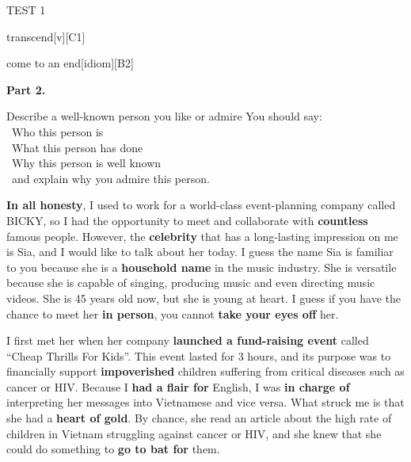 \begin{glossarymc}[Cambridge 5]
\begin{test}{TEST 1}
\begin{VocabExplain}[Part 1]
            \begin{ExplainCard}{transcend}[v][C1]
            \end{ExplainCard}

            \begin{ExplainCard}{come to an end}[idiom][B2]
            \end{ExplainCard}
        \end{VocabExplain}

    \noindent
    \textbf{Part 2.}
    \begin{qa}{Describe a well-known person you like or admire}
        You should say:\\
        \textbullet\ Who this person is\\
        \textbullet\ What this person has done\\
        \textbullet\ Why this person is well known\\
        \textbullet\ and explain why you admire this person.

        \textbf{In all honesty}, I used to work for a world-class event-planning company called BICKY, so I had the opportunity to meet and collaborate with \textbf{countless} famous people. However, the \textbf{celebrity} that has a long-lasting impression on me is Sia, and I would like to talk about her today. I guess the name Sia is familiar to you because she is a \textbf{household name} in the music industry. She is versatile because she is capable of singing, producing music and even directing music videos. She is 45 years old now, but she is young at heart. I guess if you have the chance to meet her \textbf{in person}, you cannot \textbf{take your eyes off} her.

        I first met her when her company \textbf{launched a fund-raising event} called “Cheap Thrills For Kids”. This event lasted for 3 hours, and its purpose was to financially support \textbf{impoverished} children suffering from critical diseases such as cancer or HIV. Because I \textbf{had a flair for} English, I was \textbf{in charge of} interpreting her messages into Vietnamese and vice versa. What struck me is that she had a \textbf{heart of gold}. By chance, she read an article about the high rate of children in Vietnam struggling against cancer or HIV, and she knew that she could do something to \textbf{go to bat for} them.


\end{qa}
\end{test}
\end{glossarymc}
